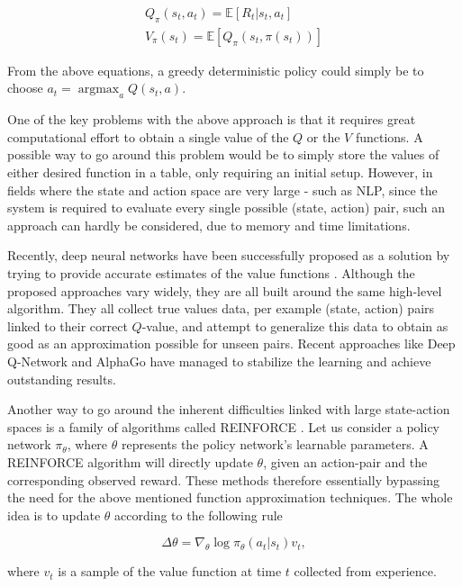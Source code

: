 \documentclass[twocolumn]{article}
\DeclareMathOperator*{\argmax}{argmax}
\begin{document}
\[
\begin{array}{l}
Q_{\pi}(s_t,a_t) = \mathbb{E}[R_t|s_t, a_t]  \\
V_{\pi}(s_t) = \mathbb{E}[Q_{\pi}(s_t,\pi(s_t))]
\end{array}
\]

\noindent From the above equations, a greedy deterministic policy could simply be to choose $a_t = \argmax_a Q(s_t,a)$. 

One of the key problems with the above approach is that it requires great computational effort to obtain a single value of the $Q$ or the $V$ functions. A possible way to go around this problem would be to simply store the values of either desired function in a table, only requiring an initial setup. However, in fields where the state and action space are very large - such as NLP, since the system is required to evaluate every single possible (state, action) pair, such an approach can hardly be considered, due to memory and time limitations. 

Recently, deep neural networks have been successfully proposed as a solution by trying to provide accurate estimates of the value functions \citep{DBLP:journals/corr/Li17b}. Although the proposed approaches vary widely, they are all built around the same high-level algorithm. They all collect true values data, per example (state, action) pairs linked to their correct $Q$-value, and attempt to generalize this data to obtain as good as an approximation possible for unseen pairs. Recent approaches like Deep Q-Network \citep{mnih2015humanlevel} and AlphaGo \citep{Go} have managed to stabilize the learning and achieve outstanding results.

 Another way to go around the inherent difficulties linked with large state-action spaces is a family of algorithms called REINFORCE \citep{Williams:1992:SSG:139611.139614}. Let us consider a policy network $\pi_\theta$, where $\theta$ represents the policy network's learnable parameters. A REINFORCE algorithm will directly update $\theta$, given an action-pair and the corresponding observed reward. These methods therefore essentially bypassing the need for the above mentioned function approximation techniques. The whole idea is to update $\theta$ according to the following rule
 
 \begin{equation*}
\Delta \theta = \nabla_{\theta} \log \pi_{\theta} (a_t|s_t)v_t,
 \end{equation*}

\noindent where $v_t$ is a sample of the value function at time $t$ collected from experience. 
\end{document}
